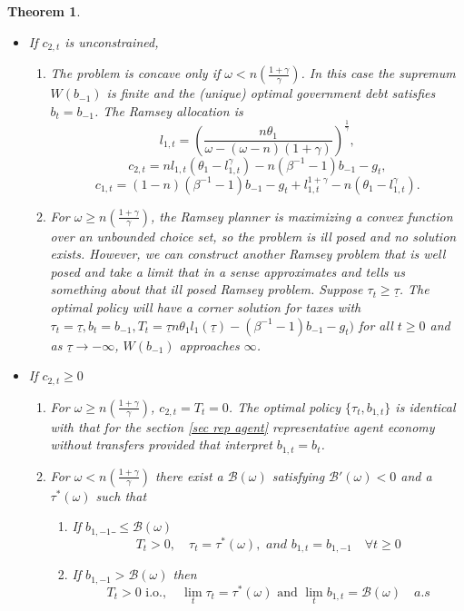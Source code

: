 \documentclass[thmsb,11pt]{article}
\newtheorem{theorem}{Theorem}
\begin{document}
\begin{theorem}
\begin{itemize}
\item If $c_{2,t}$ is unconstrained,
\begin{enumerate}

\item The problem is concave only if $\omega<n \left(\frac{1+\gamma}{\gamma}\right)$. In this case the supremum $W(b_{-1})$ is finite and the (unique) optimal government  debt satisfies  $b_{t}=b_{-1}$. The Ramsey allocation is
\[l_{1,t}=\left(\frac{n\theta_1}{\omega-(\omega-n)(1+\gamma)}\right)^{\frac{1}{\gamma}},\]\[c_{2,t}=nl_{1,t}(\theta_1-l_{1,t}^{\gamma})-n (\beta^{-1}-1)b_{-1}-g_t,\]\[c_{1,t}=(1-n)(\beta^{-1}-1)b_{-1}-g_t+l_{1,t}^{1+\gamma}-n(\theta_1-l^{\gamma}_{1,t}).\]
\item For $\omega\geq n \left(\frac{1+\gamma}{\gamma}\right)$, the Ramsey planner is maximizing  a convex function over an unbounded choice set, so the problem is ill posed and no solution exists. However, we can construct another Ramsey problem that is well posed and
    take a limit that in a sense approximates and tells us something about  that ill posed Ramsey problem.  Suppose $\tau_t\geq \underline{\tau}$. The optimal policy will have a corner solution for taxes with $\tau_t=\underline{\tau},b_t=b_{-1}, T_t=\underline{\tau}n\theta_1 l_1(\underline{\tau})-(\beta^{-1}-1)b_{-1}-g_t)$ for all $t\geq 0$ and as $\underline{\tau}\to -\infty$, $W(b_{-1})$ approaches $\infty$.
\end{enumerate}
\item If $c_{2,t}\geq 0 $

\begin{enumerate}
 \item For $\omega\geq n \left(\frac{1+\gamma}{\gamma}\right)$,  $c_{2,t} = T_t=0$.  The optimal policy $\{\tau_t,b_{1,t}\}$ is  identical
 with that for the section \ref{sec rep agent} representative agent economy without transfers provided that interpret $b_{1,t}=b_t$.
   \item For $\omega< n \left(\frac{1+\gamma}{\gamma}\right)$ there exist  a $\mathcal{B}(\omega)$  satisfying $\mathcal{B}'(\omega)<0$ and a $\tau^*(\omega)$ such that
 \begin{enumerate}
  \item If $b_{1,-1}\_\leq \mathcal{B(\omega)}$
\[T_t>0, \quad \tau_t=\tau^*(\omega), \textit{ and } b_{1,t}=b_{1,-1} \quad \forall t \geq 0 \]
\item If $b_{1,-1}> \mathcal{B(\omega)}$ then
   \[ T_t>0 \text{ i.o.},\quad \lim_t\tau_t=\tau^*(\omega) \text{ and } \lim_tb_{1,t}=\mathcal{B}(\omega)\quad \textit{a.s}\]
\end{enumerate}

\end{enumerate}
 \end{itemize}

\end{theorem}
\end{document}
